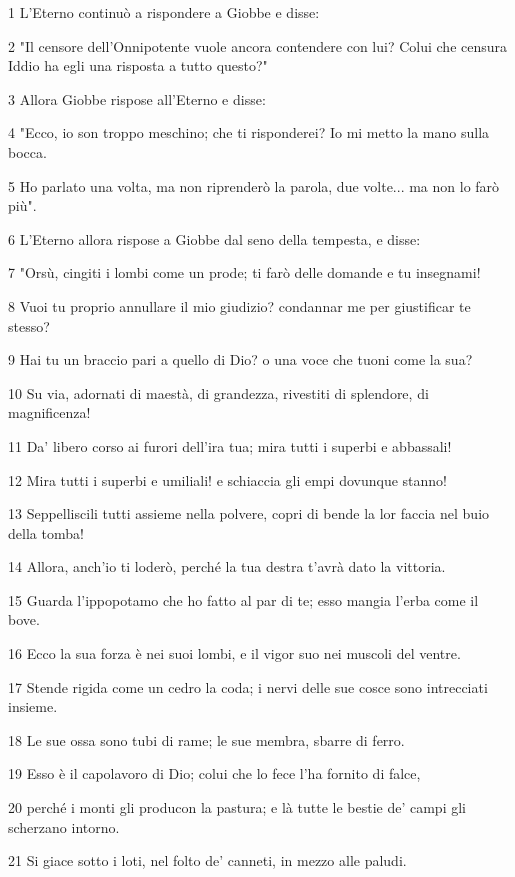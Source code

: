 \par 1 L'Eterno continuò a rispondere a Giobbe e disse:
\par 2 "Il censore dell'Onnipotente vuole ancora contendere con lui? Colui che censura Iddio ha egli una risposta a tutto questo?"
\par 3 Allora Giobbe rispose all'Eterno e disse:
\par 4 "Ecco, io son troppo meschino; che ti risponderei? Io mi metto la mano sulla bocca.
\par 5 Ho parlato una volta, ma non riprenderò la parola, due volte... ma non lo farò più".
\par 6 L'Eterno allora rispose a Giobbe dal seno della tempesta, e disse:
\par 7 "Orsù, cingiti i lombi come un prode; ti farò delle domande e tu insegnami!
\par 8 Vuoi tu proprio annullare il mio giudizio? condannar me per giustificar te stesso?
\par 9 Hai tu un braccio pari a quello di Dio? o una voce che tuoni come la sua?
\par 10 Su via, adornati di maestà, di grandezza, rivestiti di splendore, di magnificenza!
\par 11 Da' libero corso ai furori dell'ira tua; mira tutti i superbi e abbassali!
\par 12 Mira tutti i superbi e umiliali! e schiaccia gli empi dovunque stanno!
\par 13 Seppelliscili tutti assieme nella polvere, copri di bende la lor faccia nel buio della tomba!
\par 14 Allora, anch'io ti loderò, perché la tua destra t'avrà dato la vittoria.
\par 15 Guarda l'ippopotamo che ho fatto al par di te; esso mangia l'erba come il bove.
\par 16 Ecco la sua forza è nei suoi lombi, e il vigor suo nei muscoli del ventre.
\par 17 Stende rigida come un cedro la coda; i nervi delle sue cosce sono intrecciati insieme.
\par 18 Le sue ossa sono tubi di rame; le sue membra, sbarre di ferro.
\par 19 Esso è il capolavoro di Dio; colui che lo fece l'ha fornito di falce,
\par 20 perché i monti gli producon la pastura; e là tutte le bestie de' campi gli scherzano intorno.
\par 21 Si giace sotto i loti, nel folto de' canneti, in mezzo alle paludi.
